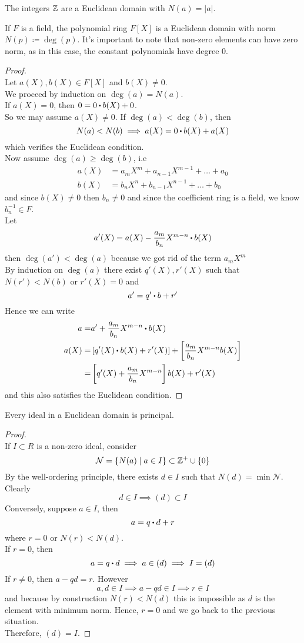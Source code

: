 \documentclass[../Main.tex]{subfiles}
\begin{document}
\begin{example}
	The integers $\mathbb{Z}$ are a Euclidean domain with $N(a)=|a|$.
\end{example}
\begin{example}
	If $F$ is a field, the polynomial ring $F[X]$ is a Euclidean domain with norm $N(p)\coloneqq \deg(p)$. It's important to note that non-zero elements can have zero norm, as in this case, the constant polynomials have degree $0$.
\end{example}
\begin{proof}~\\
	Let $a(X),b(X)\in F[X]$ and $b(X)\ne 0$.\\
	We proceed by induction on $\deg(a)=N(a)$.\\
	If $a(X)=0$, then $0=0\rdot b(X)+0$.\\
	So we may assume $a(X)\ne 0$. If $\deg(a)<\deg(b)$, then 
	\[N(a)<N(b)\implies a(X)=0\rdot b(X)+a(X)\]
	which verifies the Euclidean condition.\\
	Now assume $\deg(a)\ge \deg(b)$, i.e
	\begin{align*}
	a(X)&= a_mX^m+a_{n-1}X^{m-1}+\dots+a_0\\
	b(X)&= b_nX^n+b_{n-1}X^{n-1}+\dots+b_0
	\end{align*}
	and since $b(X)\ne 0$ then $b_n\ne 0$ and since the coefficient ring is a field, we know $b_n^{-1} \in F$.\\
	Let 
	\[a'(X)=a(X)-\frac{a_m}{b_n}X^{m-n}\rdot b(X)\]
	then $\deg(a')<\deg(a)$ because we got rid of the term $a_mX^m$\\
	By induction on $\deg(a)$ there exist $q'(X), r'(X)$ such that $N(r')<N(b)$ or $r'(X)=0$ and
	\[a'=q'\rdot b+r'\]
	Hence we can write
	\begin{align*}
	a=&a'+\frac{a_m}{b_n}X^{m-n}\rdot b(X) \\
	a(X) =& \left[q'(X)\rdot b(X)+r'(X)\right]+\left[\frac{a_m}{b_n}X^{m-n}b(X)\right]\\
	=&\left[q'(X)+\frac{a_m}{b_n}X^{m-n}\right]b(X)+r'(X)
	\end{align*}
	and this also satisfies the Euclidean condition.
\end{proof}
\newpage
\begin{prop}[title = Euclidean domains are principal]
	Every ideal in a Euclidean domain is principal.
\end{prop}
\begin{proof}~\\
	If $I\subset R$ is a non-zero ideal, consider
	\[\mathcal{N} = \{N(a)\mid a\in I\} \subset \mathbb{Z}^+\cup \{0\}\]
	By the well-ordering principle, there exists $d\in I$ such that $N(d)=\min \mathcal{N}$. Clearly
	\[d\in I \implies (d)\subset I\]
	Conversely, suppose $a\in I$, then
	\[a=q\rdot d+r\]
	where $r=0$ or $N(r)<N(d)$.\\
	If $r=0$, then  
	\[a=q\rdot d \implies a\in (d)\implies I=(d)\]
	If $r\ne 0$, then $a-qd=r$. However
	\[a,d\in I\implies a-qd\in I \implies r\in I\]
	and because by construction $N(r)<N(d)$ this is impossible as $d$ is the element with minimum norm. Hence, $r=0$ and we go back to the previous situation.\\
	Therefore, $(d)=I$.
\end{proof}
\end{document}
